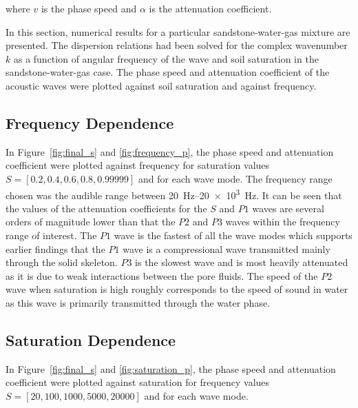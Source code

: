 \documentclass[twocolumn]{article}
\begin{document}
where $v$ is the phase speed and $\alpha$ is the attenuation coefficient.

In this section, numerical results for a particular sandstone-water-gas mixture are presented. The dispersion relations had been solved for the complex wavenumber $k$ as a function of angular frequency of the wave and soil saturation in the sandstone-water-gas case. The phase speed and attenuation coefficient of the acoustic waves were plotted against soil saturation and against frequency.

\subsection{Frequency Dependence}
In Figure~\ref{fig:final_s} and \ref{fig:frequency_p}, the phase speed and attenuation coefficient were plotted against frequency for saturation values $S = [0.2, 0.4, 0.6, 0.8, 0.99999]$ and for each wave mode. The frequency range chosen was the audible range between \SIrange{20}{20e3}{\hertz}. It can be seen that the values of the attenuation coefficients for the $S$ and $P1$ waves are several orders of magnitude lower than that the $P2$ and $P3$ waves within the frequency range of interest. The $P1$ wave is the fastest of all the wave modes which supports earlier findings that the $P1$ wave is a compressional wave transmitted mainly through the solid skeleton. $P3$ is the slowest wave and is most heavily attenuated as it is due to weak interactions between the pore fluids. The speed of the $P2$ wave when saturation is high roughly corresponds to the speed of sound in water as this wave is primarily transmitted through the water phase.

\subsection{Saturation Dependence}
In Figure~\ref{fig:final_s} and \ref{fig:saturation_p}, the phase speed and attenuation coefficient were plotted against saturation for frequency values $S = [20, 100, 1000, 5000, 20000]$ and for each wave mode.
\end{document}

